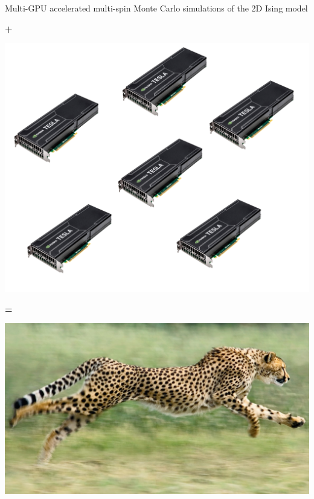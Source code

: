 \documentclass{beamer}
\begin{document}
\begin{frame}{Multi-GPU accelerated multi-spin Monte Carlo simulations of the 2D Ising model}
\begin{minipage}{0.35\textwidth}
    
\end{minipage}
\begin{minipage}{0.1\textwidth}
\textbf{\huge{+}}
\end{minipage}
\begin{minipage}{0.2\textwidth}
\includegraphics[keepaspectratio=true, width=0.2\paperwidth]{images/multi_gpu.png}
\end{minipage}
\begin{minipage}{0.1\textwidth}
\textbf{\huge{=}}
\end{minipage}
\begin{minipage}{0.2\textwidth}
\includegraphics[keepaspectratio=true, width=\textwidth]{images/cheetah.jpg}
\end{minipage}
\end{frame}
\end{document}
